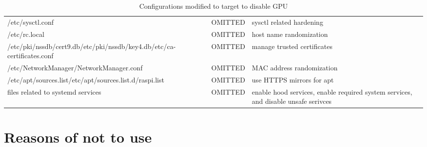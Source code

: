 \documentclass[mscthesis]{usiinfthesis}
\begin{document}
\begin{landscape}
\begin{table}[H]
\begin{tabular}{|p{70mm}|p{40mm}|p{80mm}|}
      /etc/sysctl.conf                                                                         & OMITTED                                                                                                             & sysctl related hardening                                                           \\
      /etc/rc.local                                                                            & OMITTED                                                                                                             & host name randomization                                                            \\
      /etc/pki/nssdb/cert9.db\newline /etc/pki/nssdb/key4.db\newline /etc/ca-certificates.conf & OMITTED                                                                                                             & manage trusted certificates                                                        \\
      /etc/NetworkManager/NetworkManager.conf                                                  & OMITTED                                                                                                             & MAC address randomization                                                          \\
      /etc/apt/sources.list\newline /etc/apt/sources.list.d/raspi.list                         & OMITTED                                                                                                             & use HTTPS mirrors for apt                                                          \\
      files related to systemd services                                                        & OMITTED                                                                                                             & enable hood services, enable required system services, and disable unsafe serivces \\
      \hline
    \end{tabular}
    \caption{Configurations modified to target to disable GPU}
    \label{tab:other_config}
  \end{table}
\end{landscape}

\chapter{Reasons of not to use}
\end{document}

